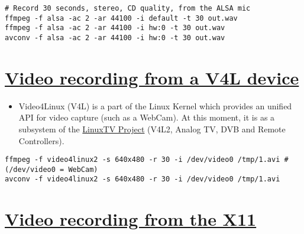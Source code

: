 \begin{verbatim}
# Record 30 seconds, stereo, CD quality, from the ALSA mic
ffmpeg -f alsa -ac 2 -ar 44100 -i default -t 30 out.wav
ffmpeg -f alsa -ac 2 -ar 44100 -i hw:0 -t 30 out.wav
avconv -f alsa -ac 2 -ar 44100 -i hw:0 -t 30 out.wav
\end{verbatim}


\section{\href{http://ffmpeg.org/ffmpeg-devices.html\#video4linux2_002c-v4l2}{Video recording from a V4L device}}

\begin{itemize}

\item Video4Linux (V4L) is a part of the Linux Kernel which provides
  an unified API for video capture (such as a WebCam). At this moment,
  it is as a subsystem of the \href{http://linuxtv.org}{LinuxTV
  Project} (V4L2, Analog TV, DVB and Remote Controllers).
\end{itemize}

\begin{verbatim}
ffmpeg -f video4linux2 -s 640x480 -r 30 -i /dev/video0 /tmp/1.avi # (/dev/video0 = WebCam)
avconv -f video4linux2 -s 640x480 -r 30 -i /dev/video0 /tmp/1.avi
\end{verbatim}


\section{\href{https://trac.ffmpeg.org/wiki/Capture/Desktop}{Video recording from the X11}}



